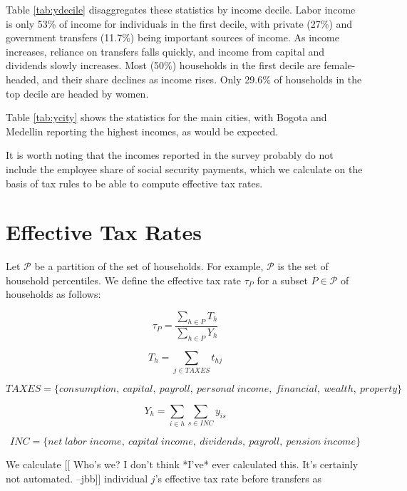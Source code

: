 \documentclass[12pt]{article}
\begin{document}
Table \ref{tab:ydecile} disaggregates these statistics by income decile.
Labor income is only 53\% of income for individuals in the first decile,
with private (27\%) and government transfers (11.7\%)
being important sources of income.
As income increases, reliance on transfers falls quickly,
and income from capital and dividends slowly increases.
Most (50\%) households in the first decile are female-headed,
and their share declines as income rises.
Only 29.6\% of households in the top decile are headed by women.

Table \ref{tab:ycity} shows the statistics for the main cities,
with Bogota and Medellin reporting the highest incomes, as would be expected.

It is worth noting that the incomes reported in the survey
probably do not include the employee share of social security payments,
which we calculate on the basis of tax rules
to be able to compute effective tax rates.

\section{Effective Tax Rates}

Let $\mathcal{P}$ be a partition of the set of households.
For example, $\mathcal{P}$ is the set of household percentiles.
We define the effective tax rate $\tau_P$
for a subset $P\in\mathcal{P}$ of households as follows:

\begin{equation}
\tau_P = \frac{\sum_{h\in P}T_{h}}{\sum_{h\in P}Y_h}
\end{equation}

\begin{equation}
T_h = \sum_{j\in TAXES}t_{hj}
\end{equation}

\begin{equation}
    TAXES=\{consumption,\ capital,\  payroll,\ personal\ income,\ financial,\ wealth,\ property\}
\end{equation}

\begin{equation}
Y_h = \sum_{i\in h}\sum_{s\in INC}y_{is}
\end{equation}

\begin{equation}
    INC=\{net \; labor \;income,\ capital \;income,\  dividends,\  payroll,\  pension \;income\}
\end{equation}

We calculate
[[  Who's we? I don't think *I've* ever calculated this.
    It's certainly not automated.
    --jbb]]
individual $j$'s effective tax rate before transfers as
\end{document}
